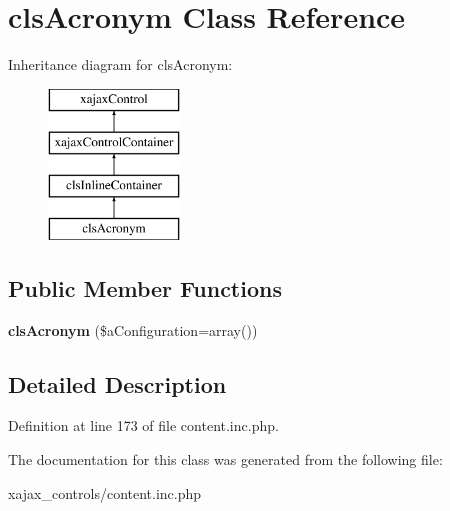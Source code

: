 \hypertarget{classclsAcronym}{
\section{clsAcronym Class Reference}
\label{classclsAcronym}
}
Inheritance diagram for clsAcronym:\begin{figure}[H]
\begin{center}
\leavevmode
\includegraphics[height=4.000000cm]{classclsAcronym}
\end{center}
\end{figure}
\subsection*{Public Member Functions}
\begin{DoxyCompactItemize}
\item 
\hypertarget{classclsAcronym_ad3dd519cb53654c2105516435bd0eca6}{
{\bfseries clsAcronym} (\$aConfiguration=array())}
\label{classclsAcronym_ad3dd519cb53654c2105516435bd0eca6}

\end{DoxyCompactItemize}


\subsection{Detailed Description}


Definition at line 173 of file content.inc.php.



The documentation for this class was generated from the following file:\begin{DoxyCompactItemize}
\item 
xajax\_\-controls/content.inc.php\end{DoxyCompactItemize}
